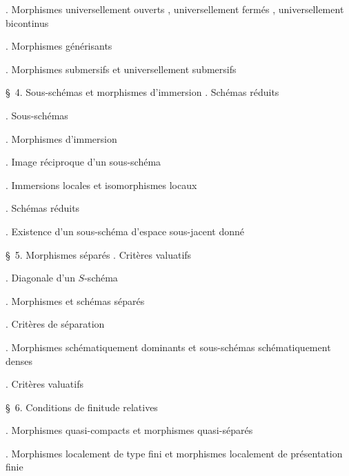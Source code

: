 
\noindent{}. Morphismes universellement ouverts , universellement fermés , universellement bicontinus\dotfill

\noindent{}. Morphismes générisants\dotfill

\noindent{}. Morphismes submersifs et universellement submersifs

\noindent\quad \S\ 4. Sous-schémas et morphismes d'immersion .\hspace{0.40em} Schémas réduits\dotfill

\noindent{}. Sous-schémas\dotfill

\noindent{}. Morphismes d'immersion\dotfill

\noindent{}. Image réciproque d'un sous-schéma\dotfill

\noindent{}. Immersions locales et isomorphismes locaux\dotfill

\noindent{}. Schémas réduits\dotfill

\noindent{}. Existence d'un sous-schéma d'espace sous-jacent donné\dotfill

\noindent\quad \S\ 5. Morphismes séparés . Critères valuatifs\dotfill

\noindent{}. Diagonale d'un $S$-schéma\dotfill

\noindent{}. Morphismes et schémas séparés\dotfill

\noindent{}. Critères de séparation\dotfill

\noindent{}. Morphismes schématiquement dominants et sous-schémas schématiquement denses\dotfill

\noindent{}. Critères valuatifs\dotfill

\noindent\quad \S\ 6. Conditions de finitude relatives\dotfill

\noindent{}. Morphismes quasi-compacts et morphismes quasi-séparés\dotfill

\noindent{}. Morphismes localement de type fini et morphismes localement de présentation finie\dotfill

